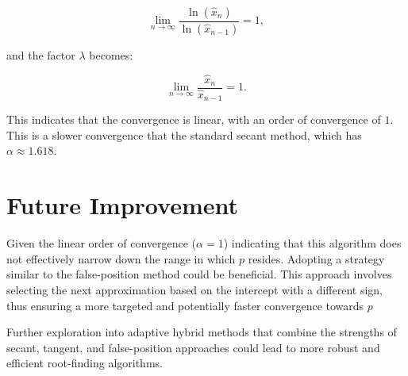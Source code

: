 \documentclass[10pt]{article}
\begin{document}
\begin{equation*}
\lim_{n \to \infty} \frac{\ln(\hat{x}_n)}{\ln(\hat{x}_{n-1})} = 1,
\end{equation*}

and the factor $\lambda$ becomes:

\begin{equation*}
\lim_{n \to \infty} \frac{\hat{x}_n}{\hat{x}_{n-1}} = 1.
\end{equation*}

This indicates that the convergence is linear, with an order of convergence of $1$.
This is a slower convergence that the standard secant method, which has \(\alpha \approx 1.618\).

\section*{Future Improvement}

Given the linear order of convergence (\(\alpha = 1\)) indicating that this algorithm does not effectively narrow down the range in which \(p\) resides. Adopting a strategy similar to the false-position method could be beneficial. This approach involves selecting the next approximation based on the intercept with a different sign, thus ensuring a more targeted and potentially faster convergence towards \(p\)

Further exploration into adaptive hybrid methods that combine the strengths of secant, tangent, and false-position approaches could lead to more robust and efficient root-finding algorithms.
\end{document}
